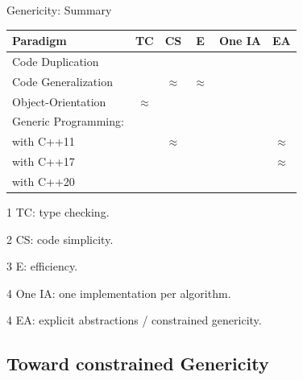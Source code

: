 \documentclass[12pt,aspectratio=169]{beamer}
\newcommand{\cmark}{\textcolor{green!50!white}{\ding{51}}}%
\newcommand{\xmark}{\textcolor{red!50!white}{\ding{55}}}%
\newcommand{\eqmark}{{\bf \(\approx\)}}
\begin{document}
\begin{frame}[fragile]{Genericity: Summary}
  \begin{table}[htbp]
    \centering
    \small
    \begin{threeparttable}
      \begin{tabular}[width=0.8\linewidth]{l|ccccc}
        Paradigm             & TC\tnote{1} & CS\tnote{2} & E\tnote{3} & One IA\tnote{4} & EA\tnote{5} \\
        \hline
        Code Duplication     & \cmark      & \xmark      & \cmark     & \xmark          & \xmark      \\
        Code Generalization  & \xmark      & \eqmark     & \eqmark    & \cmark          & \xmark      \\
        Object-Orientation   & \eqmark     & \cmark      & \xmark     & \cmark          & \cmark      \\
        Generic Programming: &             &             &            &                 &             \\
        \quad with C++11     & \cmark      & \eqmark     & \cmark     & \cmark          & \eqmark     \\
        \quad with C++17     & \cmark      & \cmark      & \cmark     & \cmark          & \eqmark     \\
        \quad with C++20     & \cmark      & \cmark      & \cmark     & \cmark          & \cmark      \\
      \end{tabular}
      \begin{tablenotes}
        \item[1] TC: type checking.
        \item[2] CS: code simplicity.
        \item[3] E: efficiency.
        \item[4] One IA: one implementation per algorithm.
        \item[4] EA: explicit abstractions / constrained genericity.
      \end{tablenotes}
      \label{table:gen.approaches}
    \end{threeparttable}
  \end{table}
\end{frame}

\subsection[Toward constrained Genericity]{Toward constrained Genericity}
\end{document}
